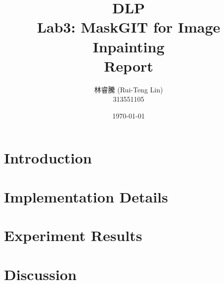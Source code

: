 \documentclass[11pt]{article}
\title{DLP\\ Lab3: MaskGIT for Image Inpainting\\Report}
\author{林睿騰 (Rui-Teng Lin)\\
313551105}
\date{\today}
\begin{document}
\begin{CJK*}{UTF8}{bsmi}  %
    \maketitle



    \newpage

    \tableofcontents

    \newpage

    \section{Introduction}
    

    \section{Implementation Details}
    

    \section{Experiment Results}
    

    \section{Discussion}
    


\end{CJK*}  %
\end{document}
